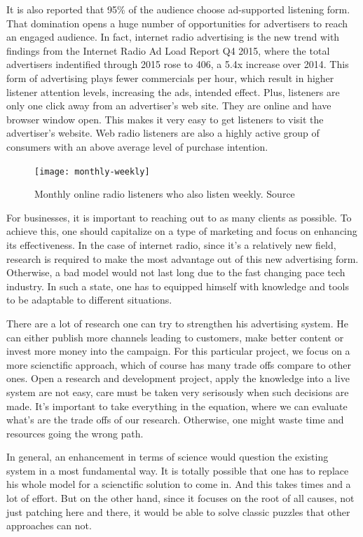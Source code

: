 It is also reported that 95\% of the audience choose ad-supported listening form. That domination opens a huge number of opportunities for advertisers to reach an engaged audience. In fact, internet radio advertising is the new trend with findings from the Internet Radio Ad Load Report Q4 2015\cite{xapp2015q4}, where the total advertisers indentified through 2015 rose to 406, a 5.4x increase over 2014. This form of advertising plays fewer commercials per hour, which result in higher listener attention levels, increasing the ads, intended effect. Plus, listeners are only one click away from an advertiser's web site. They are online and have browser window open. This makes it very easy to get listeners to visit the advertiser's website. Web radio listeners are also a highly active group of consumers with an above average level of purchase intention.


\begin{figure}[h]
	\centering
\texttt{[image: monthly-weekly]}
 	\caption{Monthly online radio listeners who also listen weekly. Source\cite{edisonslide}}
 	\label{fig:MonthlyWeekly}
\end{figure}

For businesses, it is important to reaching out to as many clients as possible. To achieve this, one should capitalize on a type of marketing and focus on enhancing its effectiveness. In the case of internet radio, since it's a relatively new field, research is required to make the most advantage out of this new advertising form. Otherwise, a bad model would not last long due to the fast changing pace tech industry. In such a state, one has to equipped himself with knowledge and tools to be adaptable to different situations.

There are a lot of research one can try to strengthen his advertising system. He can either publish more channels leading to customers, make better content or invest more money into the campaign. For this particular project, we focus on a more scienctific approach, which of course has many trade offs compare to other ones. Open a research and development project, apply the knowledge into a live system are not easy, care must be taken very serisously when such decisions are made. It's important to take everything in the equation, where we can evaluate what's are the trade offs of our research. Otherwise, one might waste time and resources going the wrong path. 

In general, an enhancement in terms of science would question the existing system in a most fundamental way. It is totally possible that one has to replace his whole model for a scienctific solution to come in. And this takes times and a lot of effort. But on the other hand, since it focuses on the root of all causes, not just patching here and there, it would be able to solve classic puzzles that other approaches can not. 

